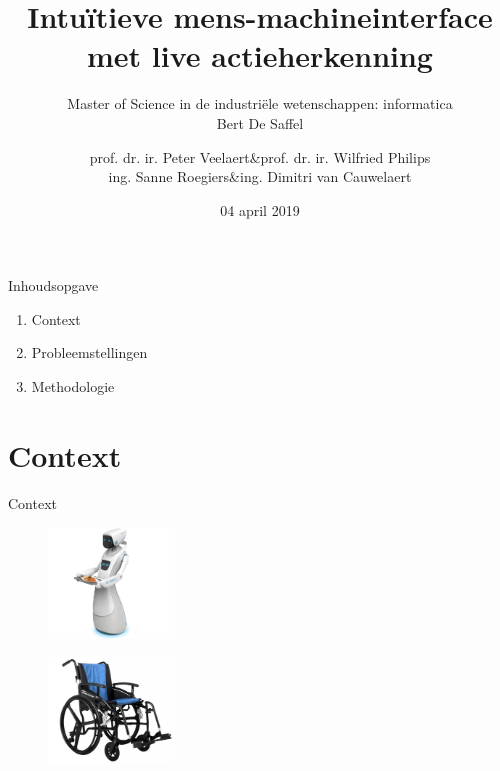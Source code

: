 \documentclass[]{beamer}
\begin{document}
	\title[Actieherkenning met de Kinect sensor]{Intuïtieve mens-machineinterface met live actieherkenning }
	\author[Bert De Saffel]{
				\begin{tabular}{rcr}
				prof. dr. ir. Peter Veelaert &\&& prof. dr. ir. Wilfried Philips \\
				ing. Sanne Roegiers &\&& ing. Dimitri van Cauwelaert
				\end{tabular}
	}
	
	\subtitle{Master of Science in de industriële wetenschappen: informatica \\ \vspace{0.2cm} Bert De Saffel}
	\date{04 april 2019}
	\frame{\titlepage}
	
	\begin{frame}{Inhoudsopgave}
		\begin{enumerate}
			\item Context
			\item Probleemstellingen
			\item Methodologie
		\end{enumerate}
	\end{frame}
	
	\section{Context}

	\begin{frame}{Context}
		\begin{figure}
				\includegraphics[width=0.3\textwidth]{imagine1}
			\end{figure}
		\begin{figure}
			\includegraphics[width=0.3\textwidth]{imagine2}
		\end{figure}
		
	\end{frame}
\end{document}
